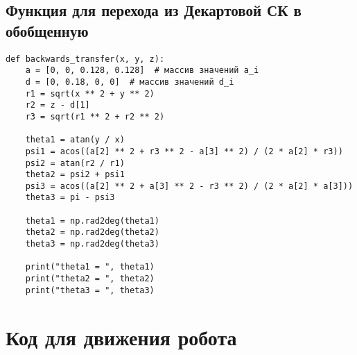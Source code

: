 \documentclass{article}
\begin{document}
\subsection{Функция для перехода из Декартовой СК в обобщенную}
\begin{verbatim}
def backwards_transfer(x, y, z):
    a = [0, 0, 0.128, 0.128]  # массив значений a_i
    d = [0, 0.18, 0, 0]  # массив значений d_i
    r1 = sqrt(x ** 2 + y ** 2)
    r2 = z - d[1]
    r3 = sqrt(r1 ** 2 + r2 ** 2)
    
    theta1 = atan(y / x)
    psi1 = acos((a[2] ** 2 + r3 ** 2 - a[3] ** 2) / (2 * a[2] * r3))
    psi2 = atan(r2 / r1)
    theta2 = psi2 + psi1
    psi3 = acos((a[2] ** 2 + a[3] ** 2 - r3 ** 2) / (2 * a[2] * a[3]))
    theta3 = pi - psi3

    theta1 = np.rad2deg(theta1)
    theta2 = np.rad2deg(theta2)
    theta3 = np.rad2deg(theta3)

    print("theta1 = ", theta1)
    print("theta2 = ", theta2)
    print("theta3 = ", theta3)
\end{verbatim}

\section{Код для движения робота}
\end{document}
